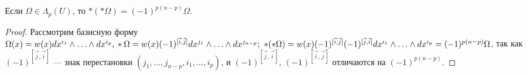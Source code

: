 \begin{prop}
	Если $\Omega\in\Lambda_p(U)$, то $*(*\Omega)=(-1)^{p(n-p)}\Omega$.
\end{prop}

\begin{proof}
	Рассмотрим базисную форму $\Omega(x)=w(x)dx^{i_1}\wedge\ldots\wedge dx^{i_p},\\ *\Omega=w(x)(-1)^{[\vec{i},\vec{j}]}dx^{j_1}\wedge\ldots\wedge dx^{j_{n-p}};\ *(*\Omega)=w(x)(-1)^{[\vec{i},\vec{j}]}(-1)^{[\vec{j},\vec{i}]}dx^{i_1}\wedge\ldots\wedge dx^{i_p}=(-1)^{p(n-p)}\Omega$, так как $(-1)^{[\vec{j}, \vec{i}]}$ --- знак перестановки $(j_1, \ldots, j_{n-p}, i_1, \ldots, i_p)$, и $(-1)^{[\vec{j}, \vec{i}]}$, $(-1)^{[\vec{i}, \vec{j}]}$ отличаются на $(-1)^{p(n-p)}$.
\end{proof}





